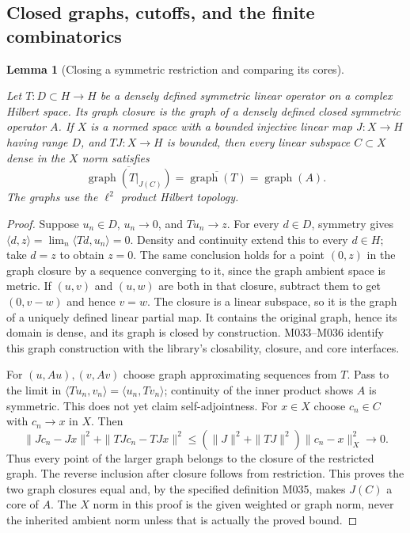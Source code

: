 \documentclass[11pt,a4paper]{article}
\newtheorem{lemma}[theorem]{Lemma}
\theoremstyle{definition}
\theoremstyle{remark}
\newcommand{\proofid}[1]{\par\smallskip{\normalfont\scriptsize\color{inkblue}Stable ID: \nolinkurl{#1}}\par\smallskip}
\begin{document}
\subsection{Closed graphs, cutoffs, and the finite combinatorics}

\begin{lemma}[Closing a symmetric restriction and comparing its cores]
\label{bridge:closure-core}
\proofid{bridge:closure-core}
\par{}\par\smallskip
Let $T:D\subset H\to H$ be a densely defined symmetric linear operator
on a complex Hilbert space. Its graph closure is the graph of a densely
defined closed symmetric operator $A$. If $X$ is a normed space with a
bounded injective linear map $J:X\to H$ having range $D$, and $TJ:X\to H$ is
bounded, then every linear subspace $C\subset X$ dense in the $X$ norm
satisfies
\[
 \overline{\operatorname{graph}(T|_{J(C)})}
       =\overline{\operatorname{graph}(T)}=\operatorname{graph}(A).
\]
The graphs use the $\ell^2$ product Hilbert topology.
\end{lemma}
\begin{proof}
Suppose $u_n\in D$, $u_n\to0$, and $Tu_n\to z$.
For every $d\in D$, symmetry gives
$\langle d,z\rangle=\lim_n\langle Td,u_n\rangle=0$.
Density and continuity extend this to every $d\in H$; take $d=z$ to
obtain $z=0$. The same conclusion holds for a point $(0,z)$ in the
graph closure by a sequence converging to it, since the graph ambient
space is metric. If $(u,v)$ and $(u,w)$ are both in that closure,
subtract them to get $(0,v-w)$ and hence $v=w$.
The closure is a linear subspace, so it is the graph of a uniquely
defined linear partial map. It contains the original graph, hence its
domain is dense, and its graph is closed by construction. M033--M036
identify this graph construction with the library's closability,
closure, and core interfaces.

For $(u,Au),(v,Av)$ choose graph approximating sequences from $T$.
Pass to the limit in
$\langle Tu_n,v_n\rangle=\langle u_n,Tv_n\rangle$;
continuity of the inner product shows $A$ is symmetric. This does
not yet claim self-adjointness.
For $x\in X$ choose $c_n\in C$ with $c_n\to x$ in $X$.
Then
\[
 \|Jc_n-Jx\|^2+\|TJc_n-TJx\|^2
 \leq(\|J\|^2+\|TJ\|^2)\|c_n-x\|_X^2\longrightarrow0.
\]
Thus every point of the larger graph belongs to the closure of the
restricted graph. The reverse inclusion after closure follows from
restriction. This proves the two graph closures equal and, by the
specified definition M035, makes $J(C)$ a core of $A$.
The $X$ norm in this proof is the given weighted or graph norm, never
the inherited ambient norm unless that is actually the proved bound.
\end{proof}
\end{document}
